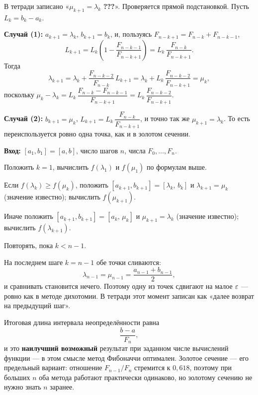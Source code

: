 \begin{idea}[title={Проверка переиспользования — ответ на «???» в тетради}]
В тетради записано «$\mu_{k+1} = \lambda_k$ \textbf{???}». Проверяется прямой
подстановкой. Пусть $L_k = b_k - a_k$.

\medskip
\textbf{Случай (1):} $a_{k+1} = \lambda_k$, $b_{k+1} = b_k$, и, пользуясь
$F_{n-k+1} = F_{n-k} + F_{n-k-1}$,
\[
  L_{k+1} = L_k\left(1 - \frac{F_{n-k-1}}{F_{n-k+1}}\right)
          = L_k\,\frac{F_{n-k}}{F_{n-k+1}} .
\]
Тогда
\[
  \lambda_{k+1} = \lambda_k + \frac{F_{n-k-2}}{F_{n-k}}\,L_{k+1}
                = \lambda_k + L_k\,\frac{F_{n-k-2}}{F_{n-k+1}}
                = \mu_k ,
\]
поскольку $\mu_k - \lambda_k = L_k\,\dfrac{F_{n-k} - F_{n-k-1}}{F_{n-k+1}}
= L_k\,\dfrac{F_{n-k-2}}{F_{n-k+1}}$.

\medskip
\textbf{Случай (2):} $b_{k+1} = \mu_k$, $L_{k+1} = L_k\,\dfrac{F_{n-k}}{F_{n-k+1}}$,
и точно так же $\mu_{k+1} = \lambda_k$. То есть переиспользуется ровно одна
точка, как и в золотом сечении.
\end{idea}

\begin{algo}[title={Метод Фибоначчи}]
\textbf{Вход:} $[a_1,b_1] = [a,b]$, число шагов $n$, числа $F_0,\dots,F_n$.

\begin{steps}
  \item Положить $k = 1$, вычислить $f(\lambda_1)$ и $f(\mu_1)$ по формулам
        выше.
  \item Если $f(\lambda_k) \ge f(\mu_k)$, положить
        $[a_{k+1},b_{k+1}] = [\lambda_k,\, b_k]$ и $\lambda_{k+1} = \mu_k$
        (значение известно); вычислить $f(\mu_{k+1})$.
  \item Иначе положить $[a_{k+1},b_{k+1}] = [a_k,\, \mu_k]$ и
        $\mu_{k+1} = \lambda_k$ (значение известно); вычислить
        $f(\lambda_{k+1})$.
  \item Повторять, пока $k < n-1$.
\end{steps}
\end{algo}

\begin{remark}
На последнем шаге $k = n-1$ обе точки сливаются:
\[
  \lambda_{n-1} = \mu_{n-1} = \frac{a_{n-1} + b_{n-1}}{2} ,
\]
и сравнивать становится нечего. Поэтому одну из точек сдвигают на малое $\varepsilon$
— ровно как в методе дихотомии. В тетради этот момент записан как «далее
возврат на предыдущий шаг».
\end{remark}

\begin{idea}
Итоговая длина интервала неопределённости равна
\[
  \frac{b-a}{F_n} ,
\]
и это \textbf{наилучший возможный} результат при заданном числе вычислений
функции — в этом смысле метод Фибоначчи оптимален. Золотое сечение — его
предельный вариант: отношение $F_{n-1}/F_n$ стремится к $0{,}618$, поэтому при
больших $n$ оба метода работают практически одинаково, но золотому сечению не
нужно знать $n$ заранее.
\end{idea}

